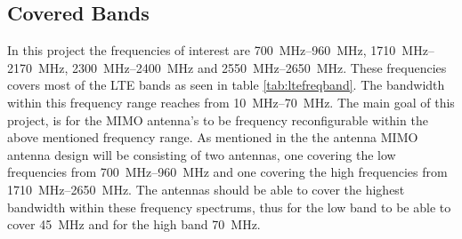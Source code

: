 \subsection{Covered Bands}
In this project the frequencies of interest are \SIrange{700}{960}{MHz}, \SIrange{1710}{2170}{MHz}, \SIrange{2300}{2400}{MHz} and \SIrange{2550}{2650}{MHz}. These frequencies covers most of the LTE bands as seen in table \ref{tab:ltefreqband}. The bandwidth within this frequency range reaches from \SIrange{10}{70}{MHz}. The main goal of this project, is for the MIMO antenna's to be frequency reconfigurable within the above mentioned frequency range. As mentioned in the  the antenna MIMO antenna design will be consisting of two antennas, one covering the low frequencies from \SIrange{700}{960}{MHz} and one covering the high frequencies from \SIrange{1710}{2650}{MHz}. The antennas should be able to cover the highest bandwidth within these frequency spectrums, thus for the low band to be able to cover \SI{45}{MHz} and for the high band \SI{70}{MHz}.  

